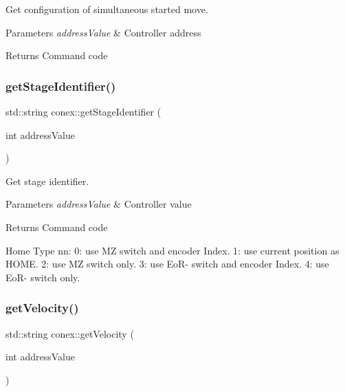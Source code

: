 Get configuration of simultaneous started move. 


\begin{DoxyParams}{Parameters}
{\em address\+Value} & Controller address \\
\hline
\end{DoxyParams}
\begin{DoxyReturn}{Returns}
Command code 
\end{DoxyReturn}
\mbox{\label{namespaceconex_ad9475bdc92877f316a2e3db9ff0e8fb1}} 
\subsubsection{\texorpdfstring{get\+Stage\+Identifier()}{getStageIdentifier()}}
{\footnotesize\ttfamily std\+::string conex\+::get\+Stage\+Identifier (\begin{DoxyParamCaption}\item[{int}]{address\+Value }\end{DoxyParamCaption})}



Get stage identifier. 


\begin{DoxyParams}{Parameters}
{\em address\+Value} & Controller value \\
\hline
\end{DoxyParams}
\begin{DoxyReturn}{Returns}
Command code
\end{DoxyReturn}
Home Type nn\+: 0\+: use MZ switch and encoder Index. 1\+: use current position as H\+O\+ME. 2\+: use MZ switch only. 3\+: use Eo\+R-\/ switch and encoder Index. 4\+: use Eo\+R-\/ switch only. \mbox{\label{namespaceconex_ab53c181f980eccedaa79f3b0154755df}} 
\subsubsection{\texorpdfstring{get\+Velocity()}{getVelocity()}}
{\footnotesize\ttfamily std\+::string conex\+::get\+Velocity (\begin{DoxyParamCaption}\item[{int}]{address\+Value }\end{DoxyParamCaption})}



